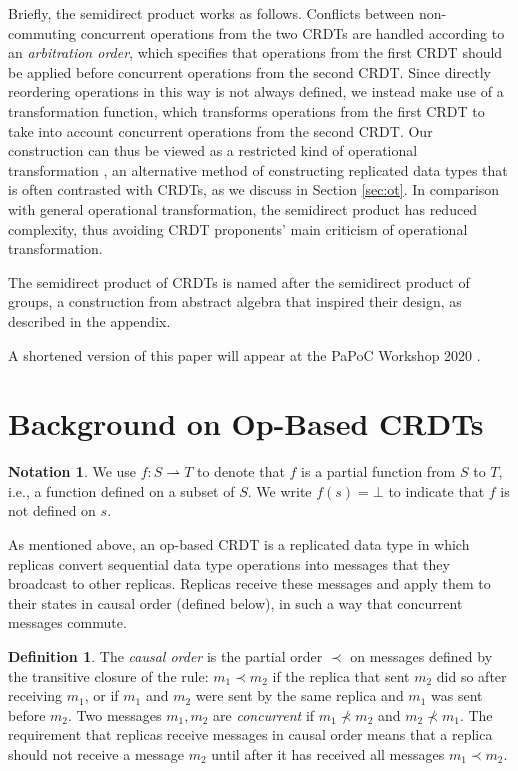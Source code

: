 \documentclass[acmsmall,nonacm,12pt]{acmart}
\newcommand{\pra}{\rightharpoonup}
\theoremstyle{plain}
\theoremstyle{definition}
\newtheorem{mydef}[mythm]{Definition}
\newtheorem*{mynot}{Notation}
\begin{document}
Briefly, the semidirect product works as follows.  Conflicts between non-commuting concurrent operations from the two CRDTs are handled according to an \textit{arbitration order}, which specifies that operations from the first CRDT should be applied before concurrent operations from the second CRDT.  Since directly reordering operations in this way is not always defined, we instead make use of a transformation function, which transforms operations from the first CRDT to take into account concurrent operations from the second CRDT.  Our construction can thus be viewed as a restricted kind of operational transformation \cite{ot_ressel}, an alternative method of constructing replicated data types that is often contrasted with CRDTs, as we discuss in Section \ref{sec:ot}.  In comparison with general operational transformation, the semidirect product has reduced complexity, thus avoiding CRDT proponents' main criticism of operational transformation.


The semidirect product of CRDTs is named after the semidirect product of groups, a construction from abstract algebra that inspired their design, as described in the appendix.

A shortened version of this paper will appear at the PaPoC Workshop 2020 \cite{papoc}.


\section{Background on Op-Based CRDTs}
\label{sec:background}
\begin{mynot}
We use $f: S \pra T$ to denote that $f$ is a partial function from $S$ to $T$, i.e., a function defined on a subset of $S$.  We write $f(s) = \bot$ to indicate that $f$ is not defined on $s$.
\end{mynot}

As mentioned above, an op-based CRDT is a replicated data type in which replicas convert sequential data type operations into messages that they broadcast to other replicas.  Replicas receive these messages and apply them to their states in causal order (defined below), in such a way that concurrent messages commute.
\begin{mydef}
The \textit{causal order} is the partial order $\prec$ on messages defined by the transitive closure of the rule: $m_1 \prec m_2$ if the replica that sent $m_2$ did so after receiving $m_1$, or if $m_1$ and $m_2$ were sent by the same replica and $m_1$ was sent before $m_2$.  Two messages $m_1, m_2$ are \textit{concurrent} if $m_1 \nprec m_2$ and $m_2 \nprec m_1$.  The requirement that replicas receive messages in causal order means that a replica should not receive a message $m_2$ until after it has received all messages $m_1 \prec m_2$.
\end{mydef}
\end{document}
